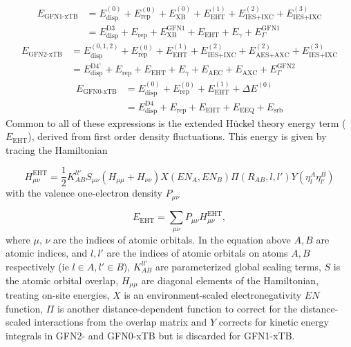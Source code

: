 \newcommand{\orderE}[2]{E^{\left(#1\right)}_{#2}}
\newcommand{\nameE}[2]{E^{#1}_{#2}}
\begin{equation}
\begin{aligned}
E_{\text{GFN1-xTB}} &= \orderE{0}{\text{disp}} + \orderE{0}{\text{rep}} + \orderE{0}{\text{XB}} + \orderE{1}{\text{EHT}} + \orderE{2}{\text{IES+IXC}} + \orderE{3}{\text{IES+IXC}} \\
&= \nameE{\text{D3}}{\text{disp}} + \nameE{}{\text{rep}} + \nameE{\text{GFN1}}{\text{XB}} + \nameE{}{\text{EHT}} + \nameE{}{\gamma} + \nameE{\text{GFN1}}{\Gamma}
\end{aligned}
\end{equation}
%
\begin{equation}
\begin{aligned}
E_{\text{GFN2-xTB}} &= \orderE{0,1,2}{\text{disp}} + \orderE{0}{\text{rep}} + \orderE{1}{\text{EHT}}  + \orderE{2}{\text{IES+IXC}} + \orderE{2}{\text{AES+AXC}} + \orderE{3}{\text{IES+IXC}} \\
&= \nameE{\text{D4'}}{\text{disp}} + \nameE{}{\text{rep}} + \nameE{}{\text{EHT}}  + \nameE{}{\gamma} + \nameE{}{\text{AEC}} + \nameE{}{\text{AXC}} + \nameE{\text{GFN2}}{\Gamma}
\end{aligned}
\end{equation}
%
\begin{equation}
\begin{aligned}
E_{\text{GFN0-xTB}} &= \orderE{0}{\text{disp}} + \orderE{0}{\text{rep}} + \orderE{1}{\text{EHT}}  + \Delta\orderE{0}{} \\
&= \nameE{\text{D4}}{\text{disp}} + \nameE{}{\text{rep}} + \nameE{}{\text{EHT}}  + \nameE{}{\text{EEQ}} + \nameE{}{\text{srb}}
\end{aligned}
\end{equation}
%
Common to all of these expressions is the extended H\"{u}ckel theory energy term ($\nameE{}{\text{EHT}}$),
derived from first order density fluctuations. This energy is given by tracing the
Hamiltonian

\begin{equation}
    H_{\mu\nu}^{\text{EHT}} = \frac{1}{2} K_{AB}^{ll'}S_{\mu\nu}\left(H_{\mu\mu} + H_{\nu\nu}\right)X\left(EN_A, EN_B\right)\Pi\left(R_{AB}, l, l'\right)Y\left(\eta^A_l\eta^B_{l'}\right)
\end{equation}
%
with the valence one-electron density $P_{\mu\nu}$

\begin{equation}
E_{\text{EHT}} = \sum_{\mu\nu} P_{\mu\nu} H_{\mu\nu}^{\text{EHT}},
\end{equation}
%
where $\mu$, $\nu$ are the indices of atomic orbitals. In the equation above $A,B$
are atomic indices, and $l,l'$ are the indices of atomic orbitals on atoms $A, B$
respectively (ie $l \in A, l' \in B$), $K_{AB}^{ll'}$ are parameterized global scaling
terms, $S$ is the atomic orbital overlap, $H_{\mu\mu}$ are diagonal elements of 
the Hamiltonian, treating on-site energies, $X$ is an environment-scaled electronegativity
$EN$ function, $\Pi$ is another distance-dependent function to correct for the distance-scaled
interactions from the overlap matrix and $Y$ corrects for kinetic energy integrals
in GFN2- and GFN0-xTB but is discarded for GFN1-xTB.

